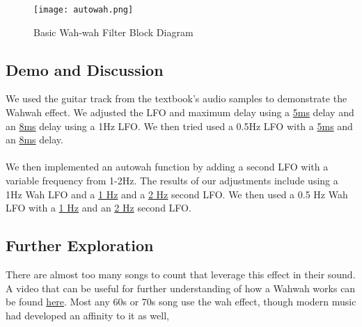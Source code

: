 \begin{figure}[ht]
	\centering
	\texttt{[image: autowah.png]}
	\caption{Basic Wah-wah Filter Block Diagram}
	\label{fig:autowah-block-diagram}
\end{figure}


\subsection{Demo and Discussion}
We used the guitar track from the textbook's audio samples to demonstrate the Wahwah effect. We adjusted the LFO and maximum delay using a
\href{run:../OutputAudio/WahWah_22-004 Original Guitar_{freq=10Hz}{delay_max=5ms}.wav}{5ms}
delay and an
\href{run:../OutputAudio/WahWah_22-004 Original Guitar_{freq=10Hz}{delay_max=8ms}.wav}{8ms}
 delay using a 1Hz LFO. We then tried used a 0.5Hz LFO with a
\href{run:../OutputAudio/WahWah_22-004 Original Guitar_{freq=20Hz}{delay_max=5ms}.wav}{5ms}
and an
\href{run:../OutputAudio/WahWah_22-004 Original Guitar_{freq=20Hz}{delay_max=8ms}.wav}{8ms}
delay.
\\ \\
We then implemented an autowah function by adding a second LFO with a variable frequency from 1-2Hz. The results of our adjustments include using a 1Hz Wah LFO and a
\href{run:../OutputAudio/WahWah_22-004 Original Guitar_{freq=10Hz}{delay_max=5ms}{LOfreq=1Hz}.wav}{1 Hz}
and a
\href{run:../OutputAudio/WahWah_22-004 Original Guitar_{freq=10Hz}{delay_max=5ms}{LOfreq=2Hz}.wav}{2 Hz}
second LFO. We then used a 0.5 Hz Wah LFO with a
\href{run:../OutputAudio/WahWah_22-004 Original Guitar_{freq=20Hz}{delay_max=5ms}{LOfreq=1Hz}.wav}{1 Hz}
and an
\href{run:../OutputAudio/WahWah_22-004 Original Guitar_{freq=20Hz}{delay_max=5ms}{LOfreq=2Hz}.wav}{2 Hz}
second LFO.

\subsection{Further Exploration}
There are almost too many songs to count that leverage this effect in their sound. A video that can be useful for further understanding of how a Wahwah works can be found \href{https://www.youtube.com/watch?v=R87mpsSAHXg}{here}. Most any 60s or 70s song use the wah effect, though modern music had developed an affinity to it as well, 
